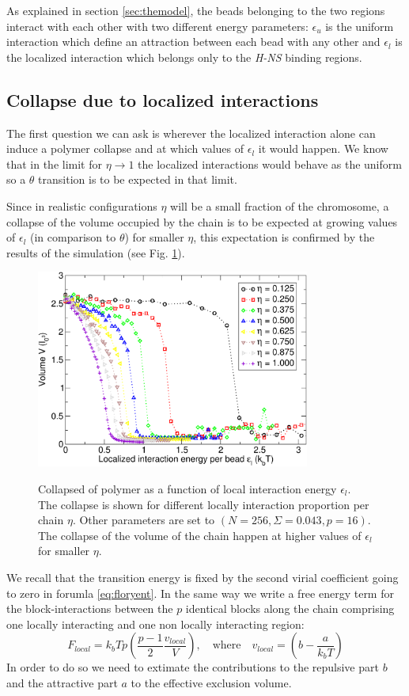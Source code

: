 \documentclass[12pt,a4paper,notitlepage]{article}
\newcommand{\hns}{\emph{H-NS}\xspace}
\begin{document}
As explained in section \ref{sec:themodel}, the beads belonging to the
two regions interact with each other with two different energy
parameters: $\epsilon_u$ is the uniform interaction which define an
attraction between each bead with any other and $\epsilon_l$ is the
localized interaction which belongs only to the \hns binding regions.

\subsection{Collapse due to localized interactions}
\label{loccollapse}

The first question we can ask is wherever the localized interaction
alone can induce a polymer collapse and at which values of
$\epsilon_l$ it would happen. We know that in the limit for $\eta \to
1$ the localized interactions would behave as the uniform so a
$\theta$ transition is to be expected in that limit.

Since in realistic configurations $\eta$ will be a small fraction of
the chromosome, a collapse of the volume occupied by the chain is to
be expected at growing values of $\epsilon_l$ (in comparison to
$\theta$) for smaller $\eta$, this expectation is confirmed by the
results of the simulation (see Fig. \ref{fig:locunicoll}).
\begin{figure}[h!]
\centering
\includegraphics[width=9cm]{local_unif_collapse}\\
\caption{Collapsed of polymer as a function of local interaction energy
  $\epsilon_l$. The collapse is shown for different locally
  interaction proportion per chain $\eta$. Other parameters are set to
$(N = 256, \Sigma = 0.043, p = 16)$. The collapse of the volume of the
chain happen at higher values of $\epsilon_l$ for smaller $\eta$.}
\label{fig:locunicoll}
\end{figure}

We recall that the transition energy is fixed 
by the second virial coefficient going to zero in forumla
\ref{eq:floryent}. In the same way we write a free energy term for the
block-interactions between the $p$ identical blocks along the chain
comprising one locally interacting and one non locally interacting
region:
\begin{equation}
  F_{local} = k_b T p \left( \frac{p - 1}{2} \frac{v_{local}}{V}
  \right), \quad \mathrm{where} \quad
  v_{local} =  \left(b - \frac{a}{k_b T}\right)
\label{eq:frlocal}
\end{equation}
In order to do so we need to extimate the contributions to the
repulsive part $b$ and the attractive part $a$ to the effective
exclusion volume.
\end{document}
